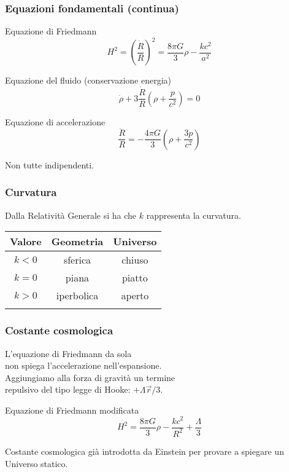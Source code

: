 \begin{frame}
  \frametitle{Equazioni fondamentali (continua)}
  \begin{block}{Equazione di Friedmann}
    \begin{equation*}
      H^2 = \left( \frac{\dot{R}}{R} \right)^2 = \frac{8\pi G}{3}\rho -
      \frac{kc^2}{a^2}
    \end{equation*}
  \end{block}
  \pause{}
  \begin{block}{Equazione del fluido (conservazione energia)}
    \begin{equation*}
      \dot{\rho} + 3\frac{\dot{R}}{R}\left( \rho + \frac{p}{c^2} \right) = 0
    \end{equation*}
  \end{block}
  \pause{}
  \begin{block}{Equazione di accelerazione}
    \begin{equation*}
    \frac{\ddot{R}}{R} = -\frac{4\pi G}{3}\left( \rho + \frac{3p}{c^2} \right)
  \end{equation*}
  \end{block}
  Non tutte indipendenti.
\end{frame}

\begin{frame}
  \frametitle{Curvatura}
  Dalla Relatività Generale si ha che $k$ rappresenta la curvatura.
  \begin{table}
    \centering
    \begin{tabular}{ccc}
      \toprule{}
      Valore  & Geometria  & Universo \\
      \midrule{}
      $k < 0$ & sferica    & chiuso   \\
      $k = 0$ & piana      & piatto   \\
      $k > 0$ & iperbolica & aperto   \\
      \bottomrule{}
    \end{tabular}
  \end{table}
\end{frame}

\begin{frame}
  \frametitle{Costante cosmologica}
  L'equazione di Friedmann da sola \\
  non spiega l'accelerazione nell'espansione. \\
  Aggiungiamo alla forza di gravità un termine \\
  repulsivo del tipo legge di Hooke: $+\Lambda\vec{r}/3$.
  \begin{block}{Equazione di Friedmann modificata}
    \begin{equation*}
      H^2 = \frac{8\pi G}{3}\rho - \frac{kc^2}{R^2} + \frac{\Lambda}{3}
    \end{equation*}
  \end{block}
  Costante cosmologica già introdotta da Einstein per provare a spiegare un
  Universo statico.
\end{frame}

